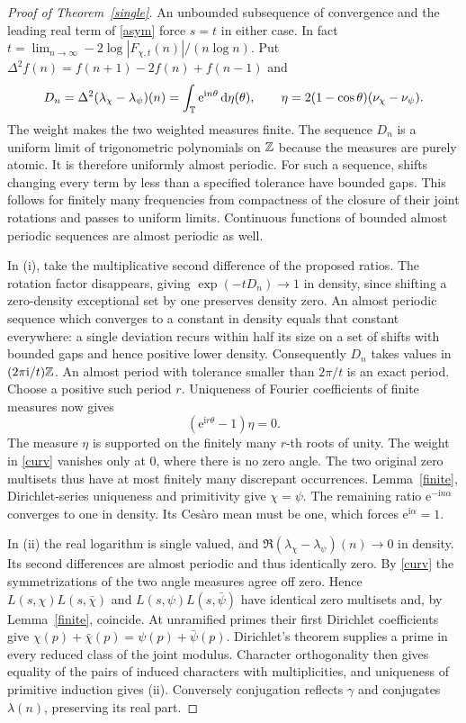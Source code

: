 \documentclass[11pt,letterpaper]{article}
\newcommand{\I}{\mathrm i}\newcommand{\e}{\mathrm e}
\theoremstyle{plain}
\theoremstyle{definition}\newtheorem{example}[theorem]{Example}
\begin{document}
\begin{proof}[Proof of Theorem~\ref{single}]
An unbounded subsequence of convergence and the leading real term of \eqref{asym} force $s=t$ in either case. In fact $t=\lim_{n\to\infty}-2\log|F_{\chi,t}(n)|/(n\log n)$. Put $\Delta^2 f(n)=f(n+1)-2f(n)+f(n-1)$ and
\begin{equation}\label{curv}
 D_n=\Delta^2(\lambda_\chi-\lambda_\psi)(n)=\int_\T\e^{\I n\theta}\dd\eta(\theta),
 \qquad \eta=2(1-\cos\theta)(\nu_\chi-\nu_\psi).
\end{equation}
The weight makes the two weighted measures finite. The sequence $D_n$ is a uniform limit of trigonometric polynomials on $\mathbb Z$ because the measures are purely atomic. It is therefore uniformly almost periodic. For such a sequence, shifts changing every term by less than a specified tolerance have bounded gaps. This follows for finitely many frequencies from compactness of the closure of their joint rotations and passes to uniform limits. Continuous functions of bounded almost periodic sequences are almost periodic as well.

In (i), take the multiplicative second difference of the proposed ratios. The rotation factor disappears, giving $\exp(-tD_n)\to1$ in density, since shifting a zero-density exceptional set by one preserves density zero. An almost periodic sequence which converges to a constant in density equals that constant everywhere: a single deviation recurs within half its size on a set of shifts with bounded gaps and hence positive lower density. Consequently $D_n$ takes values in $(2\pi\I/t)\Z$. An almost period with tolerance smaller than $2\pi/t$ is an exact period. Choose a positive such period $r$. Uniqueness of Fourier coefficients of finite measures now gives
\[
                 (\e^{\I r\theta}-1)\eta=0 .
\]
The measure $\eta$ is supported on the finitely many $r$-th roots of unity. The weight in \eqref{curv} vanishes only at $0$, where there is no zero angle. The two original zero multisets thus have at most finitely many discrepant occurrences. Lemma~\ref{finite}, Dirichlet-series uniqueness and primitivity give $\chi=\psi$. The remaining ratio $\e^{-\I n\alpha}$ converges to one in density. Its Ces\`aro mean must be one, which forces $\e^{\I\alpha}=1$.

In (ii) the real logarithm is single valued, and $\Re(\lambda_\chi-\lambda_\psi)(n)\to0$ in density. Its second differences are almost periodic and thus identically zero. By \eqref{curv} the symmetrizations of the two angle measures agree off zero. Hence $L(s,\chi)L(s,\bar\chi)$ and $L(s,\psi)L(s,\bar\psi)$ have identical zero multisets and, by Lemma~\ref{finite}, coincide. At unramified primes their first Dirichlet coefficients give $\chi(p)+\bar\chi(p)=\psi(p)+\bar\psi(p)$. Dirichlet's theorem supplies a prime in every reduced class of the joint modulus. Character orthogonality then gives equality of the pairs of induced characters with multiplicities, and uniqueness of primitive induction gives (ii). Conversely conjugation reflects $\gamma$ and conjugates $\lambda(n)$, preserving its real part.


\end{proof}
\end{document}
